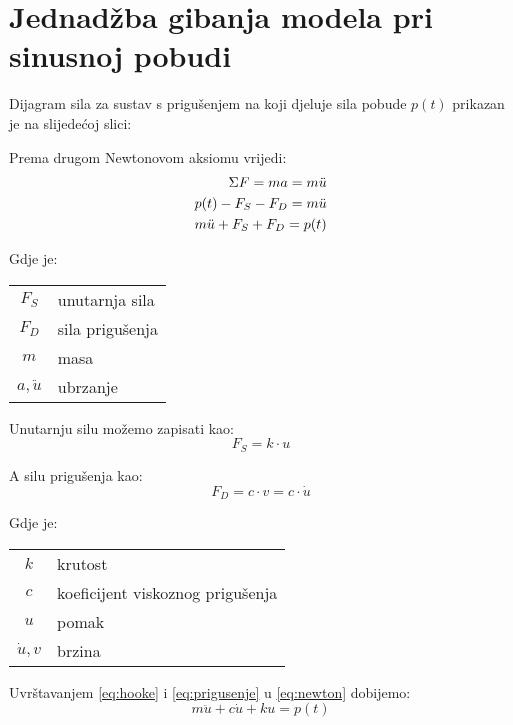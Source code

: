 \section{Jednadžba gibanja modela pri sinusnoj pobudi}
Dijagram sila za sustav s prigušenjem na koji djeluje sila pobude $p(t)$ prikazan je
na slijedećoj slici:


Prema drugom Newtonovom aksiomu vrijedi:
\begin{align}
    \Sigma F = ma = m\ddot{u}\notag\\
        p(t) - F_S - F_D = m\ddot{u} \notag\\
        m\ddot{u} + F_S + F_D = p(t) \label{eq:newton}
\end{align}

Gdje je:\\
\begin{table}[H]
\begin{tabular}{c l}
	$F_S$ & unutarnja sila \\
	$F_D$ & sila prigušenja \\
	$m$   & masa \\
        $a,\ddot{u}$   & ubrzanje\\
\end{tabular}
\end{table}

Unutarnju silu možemo zapisati kao:
\begin{equation}
	F_S = k \cdot u \label{eq:hooke}
\end{equation}

A silu prigušenja kao:
\begin{equation}
	F_D = c \cdot v = c \cdot \dot{u} \label{eq:prigusenje}
\end{equation}

Gdje je:\\
\begin{table}[H]
\begin{tabular}{c l}
	$k$ & krutost \\
	$c$ & koeficijent viskoznog prigušenja \\
	$u$ & pomak \\
	$\dot{u},v$ & brzina \\
\end{tabular}
\end{table}

Uvrštavanjem \eqref{eq:hooke} i \eqref{eq:prigusenje} u \eqref{eq:newton} dobijemo:
\begin{equation}
	m\ddot{u} + c\dot{u} + ku = p(t) \label{eq:jednadzba_opcenita_pobuda}
\end{equation}

